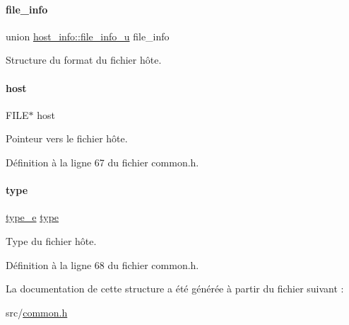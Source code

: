 \paragraph{\texorpdfstring{file\+\_\+info}{file\_info}}
{\footnotesize\ttfamily union \hyperlink{a00150}{host\+\_\+info\+::file\+\_\+info\+\_\+u}  file\+\_\+info}

Structure du format du fichier hôte. \mbox{\label{a00146_af6d0ffbfd93da5bcd61fb217a5a76789}} 
\paragraph{\texorpdfstring{host}{host}}
{\footnotesize\ttfamily F\+I\+LE$\ast$ host}

Pointeur vers le fichier hôte. 

Définition à la ligne 67 du fichier common.\+h.

\mbox{\label{a00146_a9ee26f19c3f87d2a59cf98de30a84d7d}} 
\paragraph{\texorpdfstring{type}{type}}
{\footnotesize\ttfamily \hyperlink{a00047_af1ca434cca36ba9fb2a45f6cef3a16d6}{type\+\_\+e} \hyperlink{a00047_a7aead736a07eaf25623ad7bfa1f0ee2d}{type}}

Type du fichier hôte. 

Définition à la ligne 68 du fichier common.\+h.



La documentation de cette structure a été générée à partir du fichier suivant \+:\begin{DoxyCompactItemize}
\item 
src/\hyperlink{a00047}{common.\+h}\end{DoxyCompactItemize}
